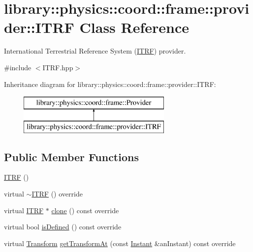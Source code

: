 \hypertarget{classlibrary_1_1physics_1_1coord_1_1frame_1_1provider_1_1_i_t_r_f}{}\section{library\+:\+:physics\+:\+:coord\+:\+:frame\+:\+:provider\+:\+:I\+T\+RF Class Reference}
\label{classlibrary_1_1physics_1_1coord_1_1frame_1_1provider_1_1_i_t_r_f}


International Terrestrial Reference System (\hyperlink{classlibrary_1_1physics_1_1coord_1_1frame_1_1provider_1_1_i_t_r_f}{I\+T\+RF}) provider.  




{\ttfamily \#include $<$I\+T\+R\+F.\+hpp$>$}

Inheritance diagram for library\+:\+:physics\+:\+:coord\+:\+:frame\+:\+:provider\+:\+:I\+T\+RF\+:\begin{figure}[H]
\begin{center}
\leavevmode
\includegraphics[height=2.000000cm]{classlibrary_1_1physics_1_1coord_1_1frame_1_1provider_1_1_i_t_r_f}
\end{center}
\end{figure}
\subsection*{Public Member Functions}
\begin{DoxyCompactItemize}
\item 
\hyperlink{classlibrary_1_1physics_1_1coord_1_1frame_1_1provider_1_1_i_t_r_f_a9c90e2865d4f076866d6d6d58e7f2e37}{I\+T\+RF} ()
\item 
virtual \hyperlink{classlibrary_1_1physics_1_1coord_1_1frame_1_1provider_1_1_i_t_r_f_a2b6d9949dcfcd4cbff44a92b8c137e9c}{$\sim$\+I\+T\+RF} () override
\item 
virtual \hyperlink{classlibrary_1_1physics_1_1coord_1_1frame_1_1provider_1_1_i_t_r_f}{I\+T\+RF} $\ast$ \hyperlink{classlibrary_1_1physics_1_1coord_1_1frame_1_1provider_1_1_i_t_r_f_a0408f17419e49f785863ba7a84865857}{clone} () const override
\item 
virtual bool \hyperlink{classlibrary_1_1physics_1_1coord_1_1frame_1_1provider_1_1_i_t_r_f_a10a6a129ab5410f3ad3d687f73ba6d8e}{is\+Defined} () const override
\item 
virtual \hyperlink{classlibrary_1_1physics_1_1coord_1_1_transform}{Transform} \hyperlink{classlibrary_1_1physics_1_1coord_1_1frame_1_1provider_1_1_i_t_r_f_a9fcd6914fa436788b84923a45fe1014e}{get\+Transform\+At} (const \hyperlink{classlibrary_1_1physics_1_1time_1_1_instant}{Instant} \&an\+Instant) const override
\end{DoxyCompactItemize}


